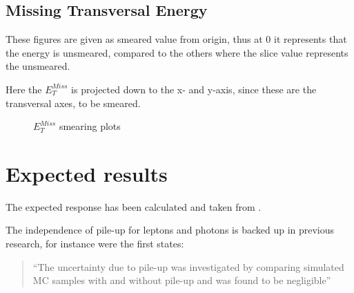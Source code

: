 \newpage
\subsection{Missing Transversal Energy}
These figures are given as smeared value from origin, thus at 0 it represents that the energy is unsmeared, compared to the others where the slice value represents the unsmeared.

Here the $E_T^{Miss}$ is projected down to the x- and y-axis, since these are the transversal axes, to be smeared. 
 \begin{figure}[H] %
    \hfill
        \hfill
   \caption{$E_T^{Miss}$ smearing plots}
    \label{fig:MET}
  \end{figure}
\newpage
\section{Expected results}\label{cha:vali:sec:expr}

The expected response has been calculated and taken from \citep{ATL-PHYS-PUB-2013-004}.

The independence of pile-up for leptons and photons is backed up in previous research, for instance \citep{Electronperf:2011, ATLAS:LOI2} were the first states:
\begin{quotation}
``The uncertainty due to pile-up was investigated by comparing simulated MC samples with and without pile-up and was found to be negligible''
\end{quotation}


